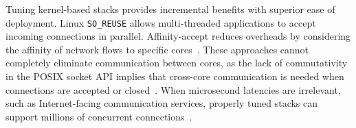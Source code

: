  Tuning kernel-based stacks provides incremental
benefits with superior ease of deployment.  Linux \texttt{SO\_REUSE}
allows multi-threaded applications to accept incoming connections in
parallel. Affinity-accept reduces overheads by considering the
affinity of network flows to specific
cores~\cite{DBLP:conf/eurosys/PesterevSZM12}. These approaches cannot
completely eliminate communication between cores, as the lack of
commutativity in the POSIX socket API implies that cross-core
communication is needed when connections are accepted or
closed~\cite{DBLP:conf/sosp/ClementsKZMK13}. When microsecond
latencies are irrelevant, such as Internet-facing communication
services, properly tuned stacks can support millions of concurrent
connections~\cite{whatsapp-2mil}.
